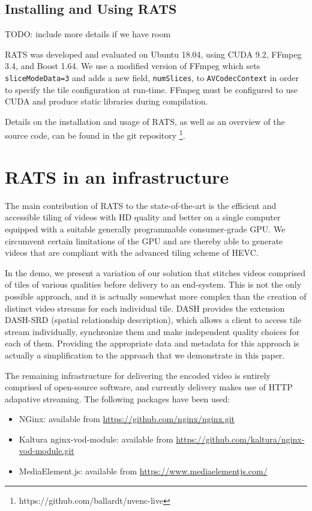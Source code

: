 \subsection{Installing and Using RATS}

TODO: include more details if we have room

RATS was developed and evaluated on Ubuntu 18.04, using CUDA 9.2, FFmpeg 3.4, and Boost 1.64. We use a modified version of FFmpeg which sets \texttt{sliceModeData=3} and adds a new field, \texttt{numSlices}, to \texttt{AVCodecContext} in order to specify the tile configuration at run-time. FFmpeg must be configured to use CUDA and produce static libraries during compilation.

Details on the installation and usage of RATS, as well as an overview of the source code, can be found in the git repository \footnote{https://github.com/ballardt/nvenc-live}.

\section{RATS in an infrastructure}

The main contribution of RATS to the state-of-the-art is the efficient and accessible
tiling of videos with HD quality and better on a single computer equipped with a
suitable generally programmable consumer-grade GPU.
We circumvent certain limitations of the GPU and are thereby able to generate videos
that are compliant with the advanced tiling scheme of HEVC.

In the demo, we present
a variation of our solution that stitches videos comprised of tiles of various
qualities before delivery to an end-system.
This is not the only possible approach, and it is actually somewhat more complex
than the creation of distinct video streams for each individual tile.
DASH provides the extension DASH-SRD (spatial relationship description), which
allows a client to access tile stream individually, synchronize them and make
independent quality choices for each of them. Providing the appropriate data and
metadata for this approach is actually a simplification to the approach that we
demonstrate in this paper.

The remaining infrastructure for delivering the encoded video is entirely comprised
of open-source software, and currently delivery makes use of HTTP adapative streaming.
The following packages have been used:
\begin{itemize}
\item NGinx: available from \url{https://github.com/nginx/nginx.git}
\item Kaltura nginx-vod-module: available from \url{https://github.com/kaltura/nginx-vod-module.git}
\item MediaElement.js: available from \url{https://www.mediaelementjs.com/}
\end{itemize}


